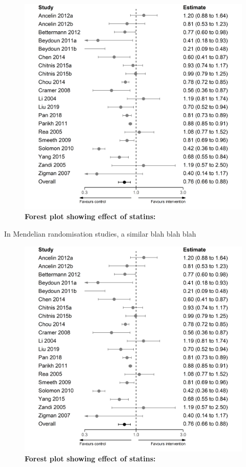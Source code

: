 \documentclass[a4paper, twoside]{templates/ociamthesis}
\begin{document}
~





\begin{figure}[H]
\includegraphics[width=1\linewidth]{figures/sys-rev/forester_statins_any} \caption[Forest plot showing effect of statins]{\textbf{Forest plot showing effect of statins:}}\label{fig:statinsNRSI}
\end{figure}

In Mendelian randomisation studies, a similar blah blah blah





\begin{figure}[H]
\includegraphics[width=1\linewidth]{figures/sys-rev/forester_statins_any} \caption[Forest plot showing effect of statins]{\textbf{Forest plot showing effect of statins:}}\label{fig:statinsMR}
\end{figure}
\end{document}

